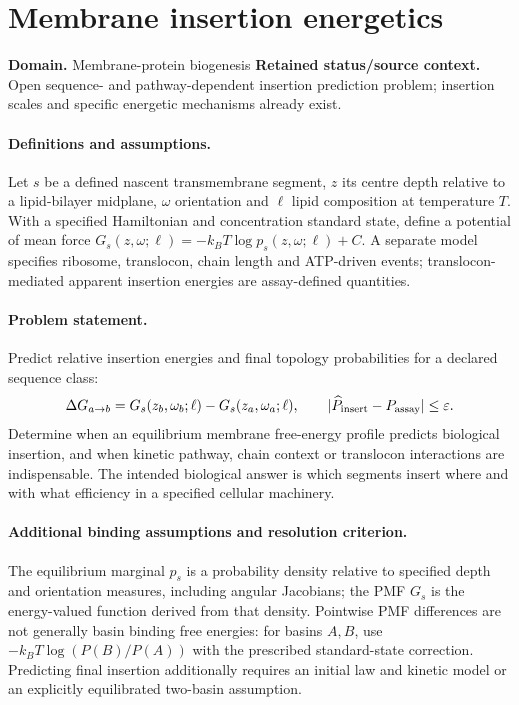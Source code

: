 \documentclass[11pt]{article}
\begin{document}
\section*{Membrane insertion energetics}
\label{prob:084}
\label{rank:67}
\par\smallskip

\noindent\textbf{Domain.} Membrane-protein biogenesis \quad \textbf{Retained status/source context.} Open sequence- and pathway-dependent insertion prediction problem; insertion scales and specific energetic mechanisms already exist.
\paragraph{Definitions and assumptions.} Let $s$ be a defined nascent transmembrane segment, $z$ its centre depth relative to a lipid-bilayer midplane, $\omega$ orientation and $\ell$ lipid composition at temperature $T$. With a specified Hamiltonian and concentration standard state, define a potential of mean force $G_s(z,\omega;\ell)=-k_BT\log p_s(z,\omega;\ell)+C$. A separate model specifies ribosome, translocon, chain length and ATP-driven events; translocon-mediated apparent insertion energies are assay-defined quantities.
\paragraph{Problem statement.} Predict relative insertion energies and final topology probabilities for a declared sequence class:
\[\Delta G_{a\to b}=G_s(z_b,\omega_b;\ell)-G_s(z_a,\omega_a;\ell),\qquad |\widehat P_{\rm insert}-P_{\rm assay}|\le\varepsilon.\]
Determine when an equilibrium membrane free-energy profile predicts biological insertion, and when kinetic pathway, chain context or translocon interactions are indispensable. The intended biological answer is which segments insert where and with what efficiency in a specified cellular machinery.
\paragraph{Additional binding assumptions and resolution criterion.} The equilibrium marginal $p_s$ is a probability density relative to specified depth and orientation measures, including angular Jacobians; the PMF $G_s$ is the energy-valued function derived from that density. Pointwise PMF differences are not generally basin binding free energies: for basins $A,B$, use $-k_BT\log(P(B)/P(A))$ with the prescribed standard-state correction. Predicting final insertion additionally requires an initial law and kinetic model or an explicitly equilibrated two-basin assumption.
\end{document}
